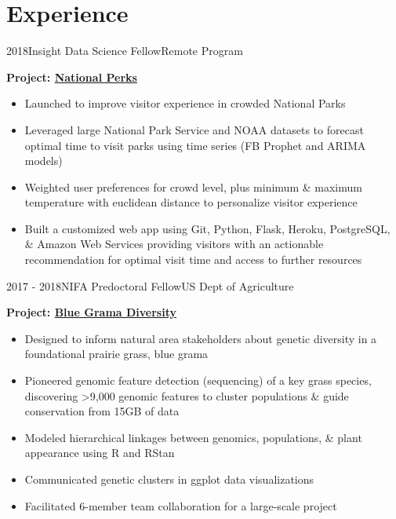 \documentclass[letterpaper]{twentysecondcv} %
\begin{document}
\section{Experience}
\begin{twenty}

        	\twentyitem
    	{2018}{}{Insight Data Science Fellow}{Remote Program}
        	{}
        { \vspace{-2mm}
        \textbf{Project: \textcolor{special}{\href{http://www.nationalperks.fun}{National Perks}}}
        \vspace{1mm} 
        {\begin{itemize}
        \item Launched to improve visitor experience in crowded National Parks
        \vspace{1mm} 
        \item Leveraged large National Park Service and NOAA datasets to forecast optimal time to visit parks using time series (FB Prophet and ARIMA models)
       \vspace{1mm} 
        \item Weighted user preferences for crowd level, plus minimum \& maximum temperature with euclidean distance to personalize visitor experience
        \vspace{1mm} 
        \item Built a customized web app using Git, Python, Flask, Heroku, PostgreSQL, \& Amazon Web Services providing visitors with an actionable recommendation for optimal visit time and access to further resources 
    \end{itemize}}  \vspace{6mm} } 
    
       \twentyitem
    	{2017 - }{2018}{NIFA Predoctoral Fellow}{US Dept of Agriculture}
        	{}
	{ \vspace{-2mm}
        \textbf{Project: \textcolor{special}{\href{https://github.com/avahoffman/blue-grama-diversity}{Blue Grama Diversity}}}
        \vspace{1mm} 
        {\begin{itemize}
        \item Designed to inform natural area stakeholders about genetic diversity in a foundational prairie grass, blue grama
        \vspace{1mm} 
        \item Pioneered genomic feature detection (sequencing) of a key grass species, discovering >9,000 genomic features to cluster populations \& guide conservation from 15GB of data
        \vspace{1mm} 
        \item Modeled hierarchical linkages between genomics, populations, \& plant appearance using R and RStan
        \vspace{1mm} 
        \item Communicated genetic clusters in ggplot data visualizations 
        \item Facilitated 6-member team collaboration for a large-scale project 
    \end{itemize}}  \vspace{6mm}  } 


\end{twenty}
\end{document}
